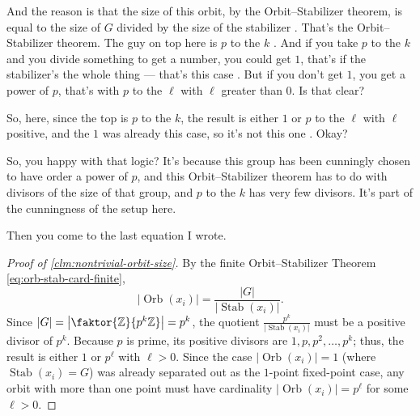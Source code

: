 \begin{proofWrapper}
\begin{speech}[00:55:07 - 00:56:59]
And the reason is that the size of this orbit, by the Orbit--Stabilizer theorem, is equal to the size of $G$ divided by the size of the stabilizer . That's the Orbit--Stabilizer theorem. The guy on top here is $p$ to the $k$ . And if you take $p$ to the $k$ and you divide something to get a number, you could get $1$, that's if the stabilizer's the whole thing --- that's this case . But if you don't get $1$, you get a power of $p$, that's with $p$ to the $\ell$ with $\ell$ greater than $0$. Is that clear?

So, here, since the top is $p$ to the $k$, the result is either $1$ or $p$ to the $\ell$ with $\ell$ positive, and the $1$ was already this case, so it's not this one . Okay?

So, you happy with that logic? It's because this group has been cunningly chosen to have order a power of $p$, and this Orbit--Stabilizer theorem has to do with divisors of the size of that group, and $p$ to the $k$ has very few divisors. It's part of the cunningness of the setup here.

Then you come to the last equation I wrote.
\end{speech}

\begin{content}

\begin{proof}[Proof of \cref{clm:nontrivial-orbit-size}]
By the finite Orbit--Stabilizer Theorem \eqref{eq:orb-stab-card-finite},
\[
|\operatorname{Orb}(x_i)| = \frac{|G|}{|\operatorname{Stab}(x_i)|}.
\]
Since $|G| = \left|\faktor{\mathbb{Z}}{p^k\mathbb{Z}}\right| = p^k$, the quotient $\frac{p^k}{|\operatorname{Stab}(x_i)|}$ must be a positive divisor of $p^k$. Because $p$ is prime, its positive divisors are $1, p, p^2, \dots, p^k$; thus, the result is either $1$ or $p^\ell$ with $\ell > 0$. Since the case $|\operatorname{Orb}(x_i)| = 1$ (where $\operatorname{Stab}(x_i) = G$) was already separated out as the $1$-point fixed-point case, any orbit with more than one point must have cardinality $|\operatorname{Orb}(x_i)| = p^\ell$ for some $\ell > 0$.
\end{proof}
\end{content}


\end{proofWrapper}
